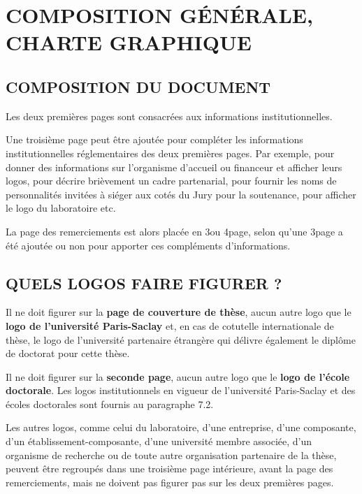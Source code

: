 \documentclass[main=french,a4paper]{book}
\begin{document}
\chapter{COMPOSITION GÉNÉRALE, CHARTE GRAPHIQUE}
\section{COMPOSITION DU DOCUMENT}
Les deux premières pages sont consacrées aux informations institutionnelles. \\ \par
Une troisième page peut être ajoutée pour compléter les informations institutionnelles réglementaires des deux premières pages. Par exemple, pour donner des informations sur l’organisme d’accueil ou financeur et afficher leurs logos, pour décrire brièvement un cadre partenarial, pour fournir les noms de personnalités invitées à siéger aux cotés du Jury pour la soutenance, pour afficher le logo du laboratoire etc. \\ \par 
La page des remerciements est alors placée en 3\ieme ou 4\ieme page, selon qu’une 3\ieme page a été ajoutée ou non pour apporter ces compléments d’informations.
\section{QUELS LOGOS FAIRE FIGURER ?}
Il ne doit figurer sur la \textbf{page de couverture de thèse}, aucun autre logo que le \textbf{logo de l’université Paris-Saclay} et, en cas de cotutelle internationale de thèse, le logo de l’université partenaire étrangère qui délivre également le diplôme de doctorat pour cette thèse. \\ \par
Il ne doit figurer sur la \textbf{seconde page}, aucun autre logo que le \textbf{logo de l’école doctorale}.
Les logos institutionnels en vigueur de l’université Paris-Saclay et des écoles doctorales sont fournis au paragraphe 7.2.\\ \par
Les autres logos, comme celui du laboratoire, d’une entreprise, d’une composante, d’un établissement-composante, d’une université membre associée, d’un organisme de recherche ou de toute autre organisation partenaire de la thèse, peuvent être regroupés dans une troisième page intérieure, avant la page des remerciements, mais ne doivent pas figurer pas sur les deux premières pages.
\end{document}
